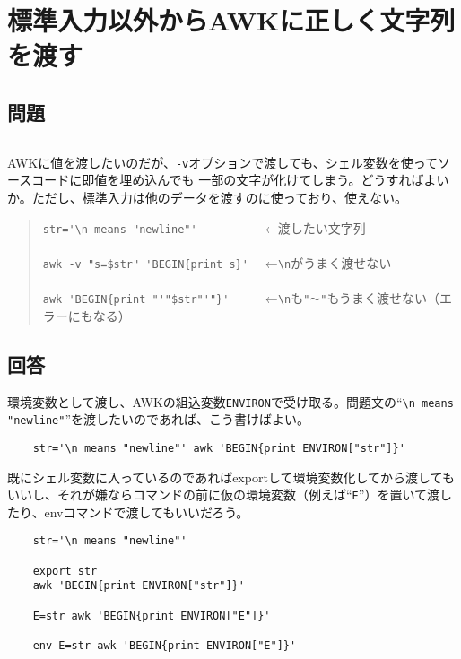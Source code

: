 \section{標準入力以外からAWKに正しく文字列を渡す}

\subsection*{問題}
\noindent
$\!\!\!\!\!$
\begin{grshfboxit}{160.0mm}
	AWKに値を渡したいのだが、\verb|-v|オプションで渡しても、シェル変数を使ってソースコードに即値を埋め込んでも
	一部の文字が化けてしまう。どうすればよいか。ただし、標準入力は他のデータを渡すのに使っており、使えない。
	\begin{quote}
		\verb|str='\n means "newline"'          | ←渡したい文字列 \\
		\verb|| \\
		\verb|awk -v "s=$str" 'BEGIN{print s}'  | ←\verb|\n|がうまく渡せない \\
		\verb|| \\
		\verb|awk 'BEGIN{print "'"$str"'"}'     | ←\verb|\n|も\verb|"～"|もうまく渡せない（エラーにもなる）
	\end{quote}
\end{grshfboxit}

\subsection*{回答}
環境変数として渡し、AWKの組込変数\verb|ENVIRON|で受け取る。問題文の``\verb|\n means "newline"|''を渡したいのであれば、こう書けばよい。\\
\begin{frameboxit}{160.0mm}
\begin{verbatim}
	str='\n means "newline"' awk 'BEGIN{print ENVIRON["str"]}'
\end{verbatim}
\end{frameboxit}
既にシェル変数に入っているのであればexportして環境変数化してから渡してもいいし、それが嫌ならコマンドの前に仮の環境変数（例えば``\verb|E|''）を置いて渡したり、envコマンドで渡してもいいだろう。\\
\begin{frameboxit}{160.0mm}
\begin{verbatim}
	str='\n means "newline"'

	export str
	awk 'BEGIN{print ENVIRON["str"]}'

	E=str awk 'BEGIN{print ENVIRON["E"]}'

	env E=str awk 'BEGIN{print ENVIRON["E"]}'
\end{verbatim}
\end{frameboxit}

